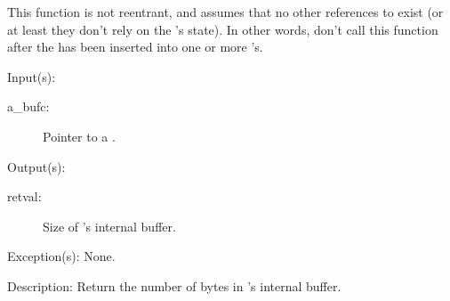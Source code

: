 \begin{capi}
\begin{capilist}
		This function is not reentrant, and assumes that no other
		references to  exist (or at least they don't rely
		on the 's state).  In other words, don't call
		this function after the  has been inserted into
		one or more 's.
	\end{capilist}
\label{bufc_size_get}
	\begin{capilist}
	\item[Input(s): ]
		\begin{description}\item[]
		\item[a\_bufc: ]
			Pointer to a .
		\end{description}
	\item[Output(s): ]
		\begin{description}\item[]
		\item[retval: ]
			Size of 's internal buffer.
		\end{description}
	\item[Exception(s): ] None.
	\item[Description: ]
		Return the number of bytes in 's internal buffer.
	\end{capilist}
\end{capi}
